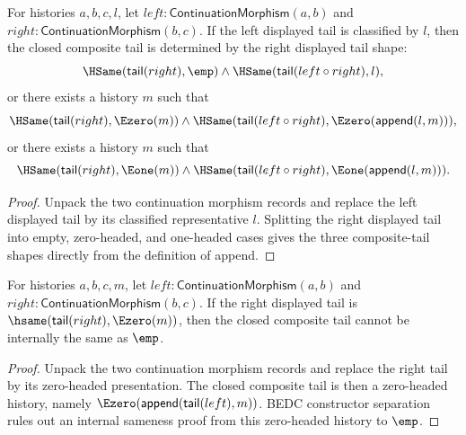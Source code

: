 \begin{theorem}
\label{thm:continuation-morphism-comp-left-tail-result-cases}
For histories $a,b,c,l$, let
$left:\mathsf{ContinuationMorphism}(a,b)$ and
$right:\mathsf{ContinuationMorphism}(b,c)$. If the left displayed tail is
classified by $l$, then the closed composite tail is determined by the right
displayed tail shape:
$$
\HSame(\mathsf{tail}(right),\emp)\land
\HSame(\mathsf{tail}(left\circ right),l),
$$
or there exists a history $m$ such that
$$
\HSame(\mathsf{tail}(right),\Ezero(m))\land
\HSame(\mathsf{tail}(left\circ right),\Ezero(\mathsf{append}(l,m))),
$$
or there exists a history $m$ such that
$$
\HSame(\mathsf{tail}(right),\Eone(m))\land
\HSame(\mathsf{tail}(left\circ right),\Eone(\mathsf{append}(l,m))).
$$
\end{theorem}
\begin{proof}
Unpack the two continuation morphism records and replace the left displayed
tail by its classified representative $l$. Splitting the right displayed tail
into empty, zero-headed, and one-headed cases gives the three composite-tail
shapes directly from the definition of append.
\end{proof}

\begin{theorem}
\label{thm:continuation-morphism-comp-right-e0-tail-result-not-empty}
For histories $a,b,c,m$, let
$left:\mathsf{ContinuationMorphism}(a,b)$ and
$right:\mathsf{ContinuationMorphism}(b,c)$. If the right displayed tail is
$\hsame(\mathsf{tail}(right),\Ezero(m))$, then the closed composite tail cannot
be internally the same as $\emp$.
\end{theorem}
\begin{proof}
Unpack the two continuation morphism records and replace the right tail by its
zero-headed presentation. The closed composite tail is then a zero-headed
history, namely $\Ezero(\mathsf{append}(\mathsf{tail}(left),m))$. BEDC
constructor separation rules out an internal sameness proof from this
zero-headed history to $\emp$.
\end{proof}

